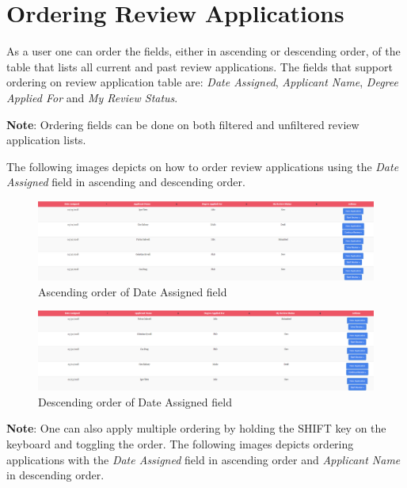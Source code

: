 \documentclass[fontsize=12pt,paper=letter,twoside]{scrartcl}
\begin{document}
\clearpage
\newpage
\section{Ordering Review Applications}
As a user one can order the fields, either in ascending or descending order, of the table that lists all current and past review applications. The fields that support ordering on review application table are: \emph{Date Assigned}, \emph{Applicant Name}, \emph{Degree Applied For} and \emph{My Review Status}.

\bigskip
\noindent \textbf{Note}: Ordering fields can be done on both filtered and unfiltered review application lists.

\bigskip
\noindent The following images depicts on how to order review applications using the \emph{Date Assigned} field in ascending and descending order.

\begin{figure}[!htb]
\begin{center}
\includegraphics[width=.9\textwidth]{images/order_ascending.png}
\end{center}
\caption{Ascending order of Date Assigned field}
\label{fig:order_ascending}
\end{figure}

\begin{figure}[!htb]
\begin{center}
\includegraphics[width=.9\textwidth]{images/order_descending.png}
\end{center}
\caption{Descending order of Date Assigned field}
\label{fig:order_descending}
\end{figure}

\newpage
\bigskip
\noindent \textbf{Note}: One can also apply multiple ordering by holding the SHIFT key on the keyboard and toggling the order. The following images depicts ordering applications with the \emph{Date Assigned} field in ascending order and \emph{Applicant Name} in descending order.
\end{document}
